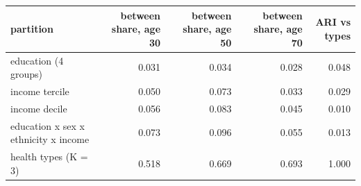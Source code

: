 \begin{tabular}{lrrrr}
\toprule
partition & between share, age 30 & between share, age 50 & between share, age 70 & ARI vs types \\
\midrule
education (4 groups) & 0.031 & 0.034 & 0.028 & 0.048 \\
income tercile & 0.050 & 0.073 & 0.033 & 0.029 \\
income decile & 0.056 & 0.083 & 0.045 & 0.010 \\
education x sex x ethnicity x income & 0.073 & 0.096 & 0.055 & 0.013 \\
health types (K = 3) & 0.518 & 0.669 & 0.693 & 1.000 \\
\bottomrule
\end{tabular}
